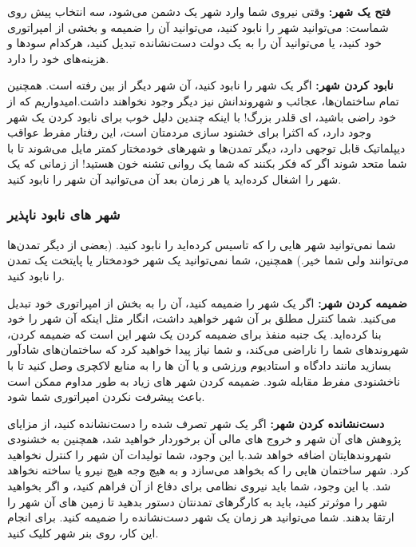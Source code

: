 \documentclass[]{article}
\begin{document}
\noindent \textbf{فتح یک شهر:}
وقتی نیروی شما وارد شهر یک دشمن می‌شود، سه انتخاب پیش روی شماست: می‌توانید شهر را نابود کنید، می‌توانید آن را ضمیمه و بخشی از امپراتوری خود کنید، یا می‌توانید آن را به یک دولت دست‌نشانده تبدیل کنید، هرکدام سود‌ها و هزینه‌های خود را دارد.

\noindent \textbf{نابود کردن شهر:}
اگر یک شهر را نابود کنید، آن شهر دیگر از بین رفته است. همچنین تمام ساختمان‌ها، عجائب و شهروندانش نیز دیگر وجود نخواهند داشت.امیدواریم که از خود راضی باشید، ای قلدر بزرگ! با اینکه چندین دلیل خوب برای نابود کردن یک شهر وجود دارد، که اکثرا برای خشنود سازی مردمتان است، این رفتار مفرط عواقب دیپلماتیک قابل توجهی دارد، دیگر تمدن‌ها و شهرهای خودمختار کمتر مایل می‌شوند تا با شما متحد شوند اگر که فکر بکنند که شما یک روانی تشنه‌ خون هستید! از زمانی که یک شهر را اشغال کرده‌اید یا هر زمان بعد آن می‌توانید آن شهر را نابود کنید.

\subsubsection*{{\titr شهر های نابود ناپذیر}}
شما نمی‌توانید شهر هایی را که تاسیس کرده‌اید را نابود کنید. (بعضی از دیگر تمدن‌ها می‌‌توانند ولی شما خیر.) همچنین، شما نمی‌توانید یک شهر خودمختار یا پایتخت یک تمدن را نابود کنید.

\noindent \textbf{ضمیمه کردن شهر:} اگر یک شهر را ضمیمه کنید، آن را به بخش از امپراتوری خود تبدیل می‌کنید. شما کنترل مطلق بر آن شهر خواهید داشت، انگار مثل اینکه آن شهر را خود بنا کرده‌اید. یک جنبه منفذ برای ضمیمه کردن یک شهر این است که ضمیمه کردن، شهروندهای شما را ناراضی می‌کند،  و شما نیاز پیدا خواهید کرد که ساختمان‌های شادآور بسازید مانند دادگاه و استادیوم ورزشی  و یا آن ها را به منابع لاکچری وصل کنید تا با ناخشنودی مفرط مقابله شود. ضمیمه کردن شهر های زیاد به طور مداوم ممکن است باعث پیشرفت نکردن امپراتوری شما شود.

\noindent \textbf{دست‌نشانده کردن شهر:} اگر یک شهر تصرف شده را دست‌نشانده کنید، از مزایای پژوهش های آن شهر و خروج های مالی آن برخوردار خواهید شد، همچنین به خشنودی شهروندهایتان اضافه خواهد شد.با این وجود، شما تولیدات آن شهر را کنترل نخواهید کرد. شهر ساختمان هایی را که بخواهد می‌سازد و به هیچ وجه هیچ نیرو یا ساخته نخواهد شد. با این وجود، شما باید نیروی نظامی برای دفاع از آن فراهم کنید، و اگر بخواهید شهر را موثرتر کنید، باید به کارگرهای تمدنتان دستور بدهید تا زمین های آن شهر را ارتقا بدهند.
شما می‌توانید هر زمان یک شهر دست‌نشانده را ضمیمه کنید. برای انجام این کار، روی بنر شهر کلیک کنید.
\end{document}
